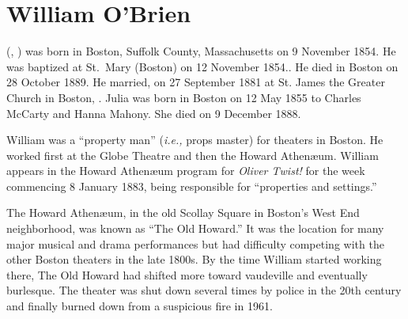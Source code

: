 \section{William O'Brien}\label{per:William3OBrien}

 (, ) was born in Boston, Suffolk County, Massachusetts on 9 November 1854.\cite{William3OBrienBirth} He was baptized at St.\ Mary (Boston) on 12 November 1854.\cite{William3OBrienBaptism}. He died in Boston on 28 October 1889.\cite{William3OBrienDeath} He married, on 27 September 1881 at St. James the Greater Church in Boston, .\cite{William3OBrienMarriage} Julia was born in Boston on 12 May 1855 to Charles McCarty and Hanna Mahony.\cite{JuliaMcCartyBaptism} She died on 9 December 1888.\cite{JuliaMcCartyDeath}

William was a ``property man'' (\textit{i.e.,} props master\cite{PropertyMan}) for theaters in Boston. He worked first at the Globe Theatre\cite{WilliamOBrien1880} and then the Howard Athen\ae um.\cite{WilliamOBrien1883} William appears in the Howard Athen\ae um program for \textit{Oliver Twist!} for the week commencing 8 January 1883, being responsible for ``properties and settings.''\cite{William3OBrienProgram} 

The Howard Athen\ae um, in the old Scollay Square in Boston's West End neighborhood, was known as ``The Old Howard.'' It was the location for many major musical and drama performances but had difficulty competing with the other Boston theaters in the late 1800s. By the time William started working there, The Old Howard had shifted more toward vaudeville and eventually burlesque. The theater was shut down several times by police in the 20th century and finally burned down from a suspicious fire in 1961.\cite{HowardAthenaeum}


